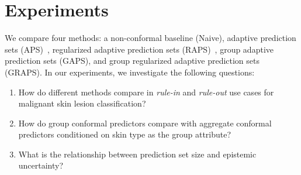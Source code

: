 \documentclass[letterpaper]{article} %
\begin{document}

\section{Experiments}
    We compare four methods: a non-conformal baseline (Naive), adaptive prediction sets (APS)~\cite{NEURIPS2020_244edd7e}, regularized adaptive prediction sets (RAPS)~\cite{angelopoulos2021uncertainty}, group adaptive prediction sets (GAPS), and group regularized adaptive prediction sets (GRAPS).
    In our experiments, we investigate the following questions:
    \begin{enumerate}
        \item How do different methods compare in \textit{rule-in} and \textit{rule-out} use cases for malignant skin lesion classification?
        \item How do group conformal predictors compare with aggregate conformal predictors conditioned on skin type as the group attribute?
        \item What is the relationship between prediction set size and epistemic uncertainty?
    \end{enumerate}
\end{document}
